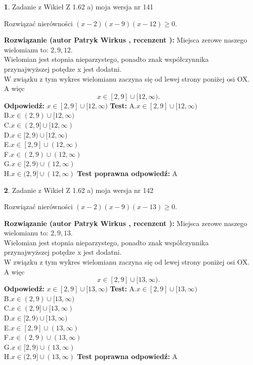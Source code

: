 \documentclass[12pt, a4paper]{article}
\theoremstyle{definition} %
\newtheorem{zad}{}
\newcommand{\zadStart}[1]{\begin{zad}#1\newline}
\newcommand{\zadStop}{\end{zad}}
\newcommand{\rozwStart}[2]{\noindent \textbf{Rozwiązanie (autor #1 , recenzent #2): }\newline}
\newcommand{\rozwStop}{\newline}
\newcommand{\odpStart}{\noindent \textbf{Odpowiedź:}\newline}
\newcommand{\odpStop}{\newline}
\newcommand{\testStart}{\noindent \textbf{Test:}\newline}
\newcommand{\testStop}{\newline}
\newcommand{\kluczStart}{\noindent \textbf{Test poprawna odpowiedź:}\newline}
\newcommand{\kluczStop}{\newline}
\begin{document}
\zadStart{Zadanie z Wikieł Z 1.62 a) moja wersja nr 141}

Rozwiązać nierówności $(x-2)(x-9)(x-12)\ge0$.
\zadStop
\rozwStart{Patryk Wirkus}{}
Miejsca zerowe naszego wielomianu to: $2, 9, 12$.\\
Wielomian jest stopnia nieparzystego, ponadto znak współczynnika przy\linebreak najwyższej potędze x jest dodatni.\\ W związku z tym wykres wielomianu zaczyna się od lewej strony poniżej osi OX. A więc $$x \in [2,9] \cup [12,\infty).$$
\rozwStop
\odpStart
$x \in [2,9] \cup [12,\infty)$
\odpStop
\testStart
A.$x \in [2,9] \cup [12,\infty)$\\
B.$x \in (2,9) \cup [12,\infty)$\\
C.$x \in (2,9] \cup [12,\infty)$\\
D.$x \in [2,9) \cup [12,\infty)$\\
E.$x \in [2,9] \cup (12,\infty)$\\
F.$x \in (2,9) \cup (12,\infty)$\\
G.$x \in [2,9) \cup (12,\infty)$\\
H.$x \in (2,9] \cup (12,\infty)$
\testStop
\kluczStart
A
\kluczStop



\zadStart{Zadanie z Wikieł Z 1.62 a) moja wersja nr 142}

Rozwiązać nierówności $(x-2)(x-9)(x-13)\ge0$.
\zadStop
\rozwStart{Patryk Wirkus}{}
Miejsca zerowe naszego wielomianu to: $2, 9, 13$.\\
Wielomian jest stopnia nieparzystego, ponadto znak współczynnika przy\linebreak najwyższej potędze x jest dodatni.\\ W związku z tym wykres wielomianu zaczyna się od lewej strony poniżej osi OX. A więc $$x \in [2,9] \cup [13,\infty).$$
\rozwStop
\odpStart
$x \in [2,9] \cup [13,\infty)$
\odpStop
\testStart
A.$x \in [2,9] \cup [13,\infty)$\\
B.$x \in (2,9) \cup [13,\infty)$\\
C.$x \in (2,9] \cup [13,\infty)$\\
D.$x \in [2,9) \cup [13,\infty)$\\
E.$x \in [2,9] \cup (13,\infty)$\\
F.$x \in (2,9) \cup (13,\infty)$\\
G.$x \in [2,9) \cup (13,\infty)$\\
H.$x \in (2,9] \cup (13,\infty)$
\testStop
\kluczStart
A
\kluczStop
\end{document}
